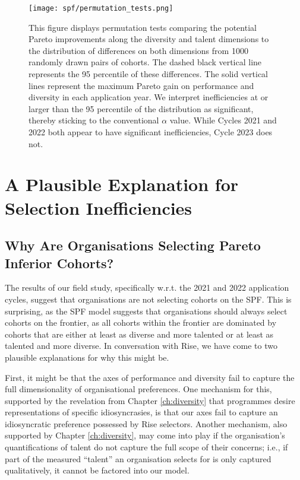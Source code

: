\begin{figure}[htbp]
    \centering
    \caption{This figure displays permutation tests comparing the potential Pareto improvements along the diversity and talent dimensions to the distribution of differences on both dimensions from 1000 randomly drawn pairs of cohorts. The dashed black vertical line represents the 95 percentile of these differences. The solid vertical lines represent the maximum Pareto gain on performance and diversity in each application year. We interpret inefficiencies at or larger than the 95 percentile of the distribution as significant, thereby sticking to the conventional $\alpha$ value. While Cycles 2021 and 2022 both appear to have significant inefficiencies, Cycle 2023 does not.}
    \label{fig:permutation_tests}
    \texttt{[image: spf/permutation\_tests.png]} 
\end{figure}

\section{A Plausible Explanation for Selection Inefficiencies}\label{sec:spfexplanation}
\subsection{Why Are Organisations Selecting Pareto Inferior Cohorts?}\label{subsec:dts_nphard}
The results of our field study, specifically w.r.t. the 2021 and 2022 application cycles, suggest that organisations are not selecting cohorts on the SPF. This is surprising, as the SPF model suggests that organisations should always select cohorts on the frontier, as all cohorts within the frontier are dominated by cohorts that are either at least as diverse and more talented or at least as talented and more diverse. In conversation with Rise, we have come to two plausible explanations for why this might be.

First, it might be that the axes of performance and diversity fail to capture the full dimensionality of organisational preferences. One mechanism for this, supported by the revelation from Chapter \ref{ch:diversity} that programmes desire representations of specific idiosyncrasies, is that our axes fail to capture an idiosyncratic preference possessed by Rise selectors. Another mechanism, also supported by Chapter \ref{ch:diversity}, may come into play if the organisation's quantifications of talent do not capture the full scope of their concerns; i.e., if part of the measured ``talent'' an organisation selects for is only captured qualitatively, it cannot be factored into our model.

